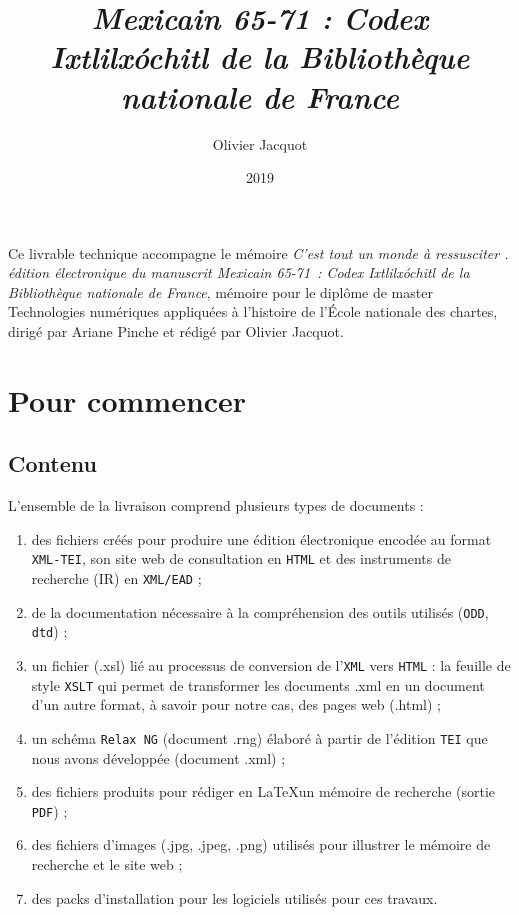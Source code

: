 \documentclass[a4paper,twoside,12pt]{article}
\title{\textit{Mexicain 65-71 : Codex Ixtlilx\'ochitl de la Biblioth\`eque nationale de France}}
\author{Olivier Jacquot}
\date{2019}
\begin{document}
\maketitle
	
Ce livrable technique accompagne le m\'emoire \emph{\og C'est tout un monde \`a ressusciter \fg{}. \'edition \'electronique du manuscrit Mexicain 65-71~: Codex Ixtlilx\'ochitl de la Biblioth\`eque nationale de France}, m\'emoire pour le dipl\^ome de master \og Technologies num\'eriques appliqu\'ees \`a l'histoire \fg{} de l'\'Ecole nationale des chartes, dirig\'e par Ariane Pinche et r\'edig\'e par Olivier Jacquot.

\section{Pour commencer}

\subsection{Contenu}

L'ensemble de la livraison comprend plusieurs types de documents :
\begin{enumerate}
	\item des fichiers cr\'e\'es pour produire une \'edition \'electronique encod\'ee au
	format \texttt{XML-TEI}, son site web de consultation en \texttt{HTML} et des instruments
	de recherche (IR) en \texttt{XML/EAD} ; 
	\item de la documentation n\'ecessaire \`a la
	compr\'ehension des outils utilis\'es (\texttt{ODD}, \texttt{dtd}) ; 
	\item un fichier (.xsl) li\'e
	au processus de conversion de l'\texttt{XML} vers \texttt{HTML} : la feuille de style \texttt{XSLT}
	qui permet de transformer les documents .xml en un document d'un autre
	format, \`a savoir pour notre cas, des pages web (.html) ; 
	\item un sch\'ema \texttt{Relax NG} (document .rng) \'elabor\'e \`a partir de l'\'edition \texttt{TEI} que nous
	avons d\'evelopp\'ee (document .xml) ;
	\item des fichiers produits pour r\'ediger en \LaTeX un m\'emoire de recherche (sortie \texttt{PDF}) ; 
	\item des fichiers d'images	(.jpg, .jpeg, .png) utilis\'es pour illustrer le m\'emoire de recherche et le
	site web ;
	\item des packs d'installation pour les logiciels utilis\'es pour ces travaux.
\end{enumerate}
\end{document}

